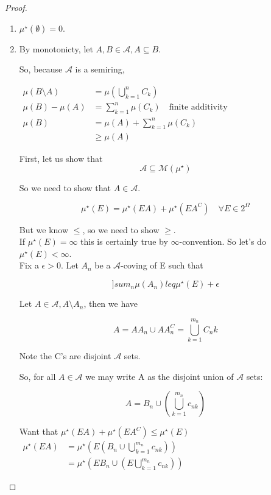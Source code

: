 \documentclass[11pt,fleqn]{book} %
\begin{document}
\begin{proof}
	\begin{enumerate}
		\item  $\mu^\star(\emptyset) = 0$.
		\item By monotonicty, let $A, B \in \mathcal{A}, A \subseteq B$. 

		So, because $\mathcal{A}$ is a semiring, 

			$\begin{aligned}
						\mu(B \setminus A) & = \mu( \bigcup^n_{k =1} C_k)\\	
						\mu(B) - \mu(A) &= \sum^n_{k =1} \mu(C_k) \quad \text{finite additivity}\\
						\mu(B) &= \mu(A) + \sum^n_{k =1} \mu(C_k)\\
							&\geq \mu(A)
				\end{aligned}$

				First, let us show that 
						$$\mathcal{A} \subseteq \mathcal{M}(\mu^\star) $$

			So we need to show that $A \in \mathcal{A}$. 

				$$\mu^\star(E) = \mu^\star(EA) + \mu^\star(EA^C) \quad \forall E \in 2^\Omega$$

		But we know $\leq$, so we need to show $\geq$.\\

 		If $\mu^\star(E) = \infty$ this is certainly true by $\infty$-convention. So let's do $\mu^\star(E) < \infty$.\\

 		Fix a $\epsilon > 0$. Let $A_n$ be a $\mathcal{A}$-coving of E such that

 				$$]sum_n \mu(A_n) leq \mu^\star(E) + \epsilon $$

 		Let $A \in \mathcal{A}, A\setminus A_n$, then we have

 			$$A = A A_n \cup A A_n^C = \bigcup^{m_n}_{k = 1}C_nk $$

 			Note the C's are disjoint $\mathcal{A}$ sets. 

 		So, for all $A \in \mathcal{A}$ we may write A as the disjoint union of $\mathcal{A}$ sets:

 				$$A = B_n \cup \left(\bigcup^{m_n}_{k=1} c_{nk} \right) $$

 		Want that $\mu^\star(EA) +  \mu^\star(EA^C) \leq \mu^\star(E)$
 			$\begin{aligned}
 				\mu^\star(EA) &= \mu^\star \left(E(B_n \cup \bigcup^{m_n}_{k=1} c_{nk}) \right)\\
 					&= \mu^\star\left( E B_n \cup (E\bigcup^{m_n}_{k=1} c_{nk})\right)
 			\end{aligned}$
	\end{enumerate}
\end{proof}
\end{document}
